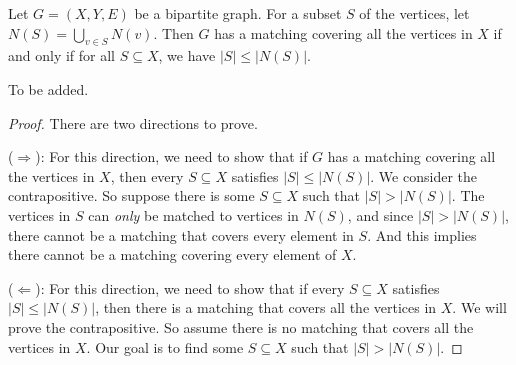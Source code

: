 \begin{flex}
\label{grp:theorem:Halls-Theorem}

\begin{theorem}
\label{theorem:Halls-Theorem}
Let $G = (X,Y,E)$ be a bipartite graph. For a subset $S$ of the vertices, let $N(S) = \bigcup_{v \in S} N(v)$. Then $G$ has a matching covering all the vertices in $X$ if and only if for all $S \subseteq X$, we have $|S| \leq |N(S)|$.

\end{theorem}

\begin{gram}
\label{grm:matchings-in-graphs::visualization}
To be added.

\end{gram}

\begin{proof}
\label{prf:matchings-in-graphs::prove}
There are two directions to prove.

\noindent
($\Longrightarrow$): For this direction, we need to show that if $G$ has a matching covering all the vertices in $X$, then every $S \subseteq X$ satisfies $|S| \leq |N(S)|$. We consider the contrapositive. So suppose there is some $S \subseteq X$ such that $|S| > |N(S)|$. The vertices in $S$ can \emph{only} be matched to vertices in $N(S)$, and since $|S| > |N(S)|$, there cannot be a matching that covers every element in $S$. And this implies there cannot be a matching covering every element of $X$.

\noindent
($\Longleftarrow$): For this direction, we need to show that if every $S \subseteq X$ satisfies $|S| \leq |N(S)|$, then there is a matching that covers all the vertices in $X$. We will prove the contrapositive. So assume there is no matching that covers all the vertices in $X$. Our goal is to find some $S \subseteq X$ such that $|S| > |N(S)|$. 


\end{proof}
\end{flex}
